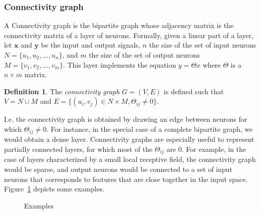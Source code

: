\documentclass{article}
\theoremstyle{definition}
\newtheorem{definition}{Definition}[section]
\theoremstyle{remark}
\theoremstyle{plain}
\begin{document}
\subsubsection{Connectivity graph}
\label{con_graph}

A Connectivity graph is the bipartite graph whose adjacency matrix is the connectivity matrix of a layer of neurons.
Formally, given a linear part of a layer, let $\textbf{x}$ and $\textbf{y}$ be the input and output signals, $n$ the size of the set of input neurons $N = \{u_1, u_2, \ldots, u_n\}$, and $m$ the size of the set of output neurons $M = \{v_1, v_2, \ldots, v_m\}$. This layer implements the equation $y = \Theta x$ where $\Theta$ is a $n \times m$ matrix.

\begin{definition}
{The \emph{connectivity graph} $G = (V,E)$ is defined such that $V = N \cup M$ and $E = \{(u_i,v_j) \in  N \times M, \Theta_{ij} \neq 0 \} $.}
\end{definition}

I.e. the connectivity graph is obtained by drawing an edge between neurons for which $\Theta_{ij} \neq 0$.
For instance, in the special case of a complete bipartite graph, we would obtain a dense layer. 
Connectivity graphs are especially useful to represent partially connected layers, for which most of the $\Theta_{ij}$ are $0$. 
For example, in the case of layers characterized by a small local receptive field, the connectivity graph would be sparse, and output neurons would be connected to a set of input neurons that corresponds to features that are close together in the input space. Figure~\ref{con_ex} depicts some examples.

\begin{figure}[h]
  \begin{center}
  \end{center}
  \caption{Examples}
  \label{con_ex}
\end{figure}
\end{document}
